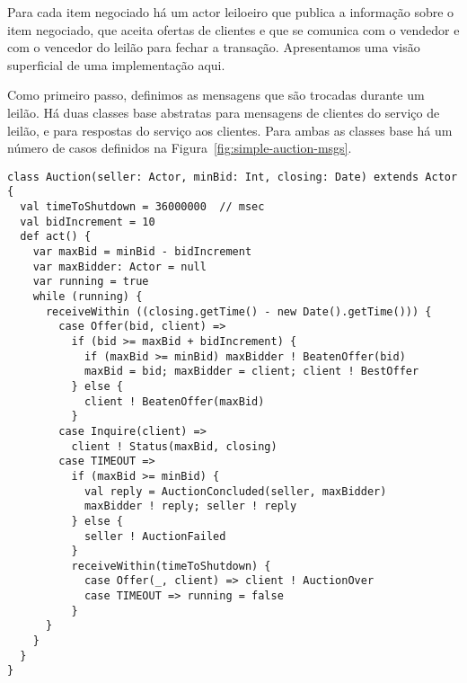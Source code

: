 Para cada item negociado há um actor leiloeiro que publica a 
informação sobre o item negociado, que aceita ofertas de clientes
e que se comunica com o vendedor e com o vencedor do leilão 
para fechar a transação. Apresentamos uma visão superficial de uma
 implementação aqui.

Como primeiro passo, definimos as mensagens que são trocadas durante um
leilão. Há duas classes base abstratas  para mensagens 
de clientes do serviço de leilão, e  para respostas 
do serviço aos clientes. Para ambas as classes base há um número de casos 
definidos na Figura~\ref{fig:simple-auction-msgs}.

\begin{lstlisting}[style=floating,label=fig:simple-auction,caption=Implementation of an Auction Service]
class Auction(seller: Actor, minBid: Int, closing: Date) extends Actor {
  val timeToShutdown = 36000000  // msec
  val bidIncrement = 10
  def act() {
    var maxBid = minBid - bidIncrement
    var maxBidder: Actor = null
    var running = true
    while (running) {
      receiveWithin ((closing.getTime() - new Date().getTime())) {
        case Offer(bid, client) =>
          if (bid >= maxBid + bidIncrement) { 
            if (maxBid >= minBid) maxBidder ! BeatenOffer(bid)
            maxBid = bid; maxBidder = client; client ! BestOffer
          } else {
            client ! BeatenOffer(maxBid)
          }
        case Inquire(client) =>
          client ! Status(maxBid, closing)
        case TIMEOUT =>
          if (maxBid >= minBid) {
            val reply = AuctionConcluded(seller, maxBidder)
            maxBidder ! reply; seller ! reply
          } else {
            seller ! AuctionFailed
          }
          receiveWithin(timeToShutdown) {
            case Offer(_, client) => client ! AuctionOver
            case TIMEOUT => running = false
          }
      }
    }
  } 
}
\end{lstlisting}

